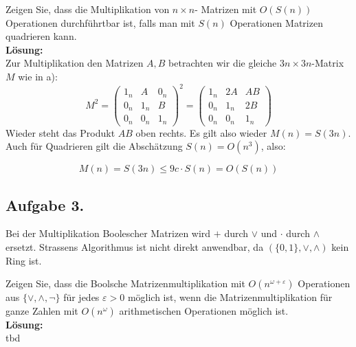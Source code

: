 \documentclass[11pt,a4paper,ngerman]{article}
\begin{document}
Zeigen Sie, dass die Multiplikation von $n \times n$- Matrizen mit $O(S(n))$ Operationen durchführtbar ist, falls man mit $S(n)$ Operationen Matrizen quadrieren kann.\\

\textbf{Lösung:}\\
Zur Multiplikation den Matrizen $A,B$ betrachten wir die gleiche $3n \times 3n$-Matrix $M$ wie in a):
\begin{equation}\label{eq:square}
  M^{2} = \left(\begin{array}{ccc}
              1_n & A   & 0_n \\
              0_n & 1_n & B \\
              0_n & 0_n & 1_n
           \end{array}\right)^{2}
         = \left(\begin{array}{ccc}
              1_n & 2A   & AB \\
              0_n & 1_n & 2B \\
              0_n & 0_n & 1_n
           \end{array}\right)
\end{equation}
Wieder steht das Produkt $AB$ oben rechts. Es gilt also wieder $M(n) = S(3n)$. Auch für Quadrieren gilt
die Abschätzung $S(n) = O(n^3)$, also:

\begin{equation}
  M(n) = S(3n) {\leq} 9c\cdot S(n) = O(S(n))
\end{equation}


\subsection*{Aufgabe 3.}

Bei der Multiplikation Boolescher Matrizen wird $+$ durch $\lor$ und $\cdot$ durch $\land$ ersetzt. Strassens Algorithmus ist nicht direkt anwendbar, da $(\{0,1\}, \lor, \land)$ kein Ring ist.

Zeigen Sie, dass die Boolsche Matrizenmultiplikation mit $O( n^{\omega + \varepsilon} )$ Operationen aus $\{ \lor, \land, \neg \}$ für jedes $\varepsilon > 0$ möglich ist, wenn die Matrizenmultiplikation für ganze Zahlen mit $O(n^\omega )$ arithmetischen Operationen möglich ist.\\

\textbf{Lösung:}\\

tbd

\label{LastPage}
\end{document}
